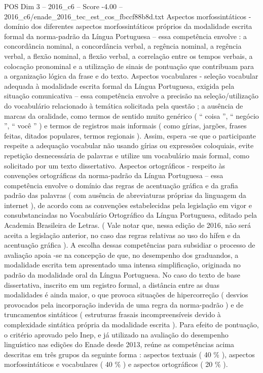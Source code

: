 \begin{textsample}{POS Dim 3 – 2016\_c6 – Score -4.00 – 2016\_c6/enade\_2016\_tec\_est\_cos\_fbccf88b8d.txt}
Aspectos morfossintáticos - domínio dos diferentes aspectos morfossintáticos próprios da modalidade escrita formal da norma-padrão da Língua Portuguesa – essa competência envolve : a concordância nominal, a concordância verbal, a regência nominal, a regência verbal, a flexão nominal, a flexão verbal, a correlação entre os tempos verbais, a colocação pronominal e a utilização de sinais de pontuação que contribuam para a organização lógica da frase e do texto.
Aspectos vocabulares - seleção vocabular adequada à modalidade escrita formal da Língua Portuguesa, exigida pela situação comunicativa – essa competência envolve a precisão na seleção/utilização do vocabulário relacionado à temática solicitada pela questão ; a ausência de marcas da oralidade, como termos de sentido muito genérico ( “ coisa ”, “ negócio ”, “ você ” ) e termos de registros mais informais ( como gírias, jargões, frases feitas, ditados populares, termos regionais ).
Assim, espera -se que o participante respeite a adequação vocabular não usando gírias ou expressões coloquiais, evite repetição desnecessária de palavras e utilize um vocabulário mais formal, como solicitado por um texto dissertativo.
Aspectos ortográficos - respeito às convenções ortográficas da norma-padrão da Língua Portuguesa – essa competência envolve o domínio das regras de acentuação gráfica e da grafia padrão das palavras ( com ausência de abreviaturas próprias da linguagem da internet ), de acordo com as convenções estabelecidas pela legislação em vigor e consubstanciadas no Vocabulário Ortográfico da Língua Portuguesa, editado pela Academia Brasileira de Letras. ( Vale notar que, nessa edição de 2016, não será aceita a legislação anterior, no caso das regras relativas ao uso do hífen e da acentuação gráfica ).
A escolha dessas competências para subsidiar o processo de avaliação apoia -se na concepção de que, no desempenho dos graduandos, a modalidade escrita tem apresentado uma intensa simplificação, originada no padrão da modalidade oral da Língua Portuguesa.
No caso do texto de base dissertativa, inscrito em um registro formal, a distância entre as duas modalidades é ainda maior, o que provoca situações de hipercorreção ( desvios provocados pela incorporação indevida de uma regra da norma-padrão ) e de truncamentos sintáticos ( estruturas frasais incompreensíveis devido à complexidade sintática própria da modalidade escrita ).
Para efeito de pontuação, o critério aprovado pelo Inep, e já utilizado na avaliação do desempenho linguístico nas edições do Enade desde 2013, reúne as competências acima descritas em três grupos da seguinte forma : aspectos textuais ( 40 \% ), aspectos morfossintáticos e vocabulares ( 40 \% ) e aspectos ortográficos ( 20 \% ).

\end{textsample}
